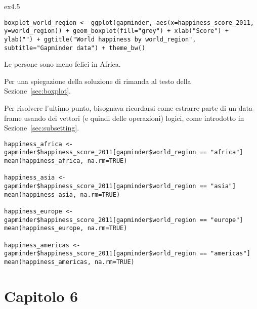 \begin{solution}{ex4.5}

\begin{lstlisting}[style=Rstylescript]
boxplot_world_region <- ggplot(gapminder, aes(x=happiness_score_2011, y=world_region)) + geom_boxplot(fill="grey") + xlab("Score") + ylab("") + ggtitle("World happiness by world_region", subtitle="Gapminder data") + theme_bw()
\end{lstlisting}

\noindent Le persone sono meno felici in Africa.

\noindent Per una spiegazione della soluzione di rimanda al testo della Sezione~\ref{sec:boxplot}.

\vspace{0.2cm} 

\noindent Per risolvere l'ultimo punto, bisognava ricordarsi come estrarre parte di un data frame usando dei vettori (e quindi delle operazioni) logici, come introdotto in Sezione~\ref{sec:subsetting}.

\begin{lstlisting}[style=Rstylescript]
happiness_africa <- gapminder$happiness_score_2011[gapminder$world_region == "africa"]
mean(happiness_africa, na.rm=TRUE)

happiness_asia <- gapminder$happiness_score_2011[gapminder$world_region == "asia"]
mean(happiness_asia, na.rm=TRUE)

happiness_europe <- gapminder$happiness_score_2011[gapminder$world_region == "europe"]
mean(happiness_europe, na.rm=TRUE)

happiness_americas <- gapminder$happiness_score_2011[gapminder$world_region == "americas"]
mean(happiness_americas, na.rm=TRUE)
\end{lstlisting}


\end{solution}	

\newpage

\section{Capitolo 6}

